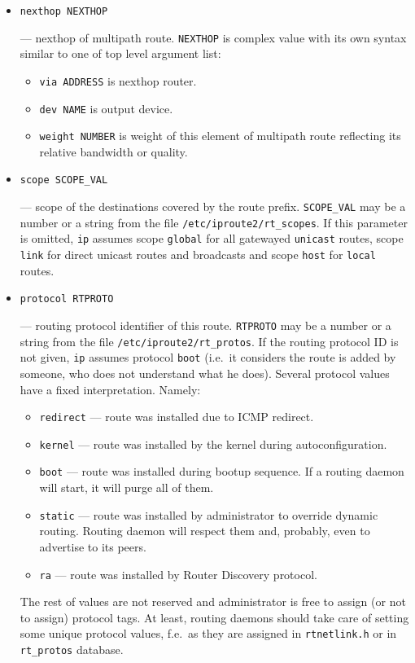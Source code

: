 \begin{itemize}
\item \verb|nexthop NEXTHOP|

--- nexthop of multipath route. \verb|NEXTHOP| is complex value
with its own syntax similar to one of top level argument list:
\begin{itemize}
\item \verb|via ADDRESS| is nexthop router.
\item \verb|dev NAME| is output device.
\item \verb|weight NUMBER| is weight of this element of multipath
route reflecting its relative bandwidth or quality.
\end{itemize}

\item \verb|scope SCOPE_VAL|

--- scope of the destinations covered by the route prefix.
\verb|SCOPE_VAL| may be a number or a string from the file
\verb|/etc/iproute2/rt_scopes|.
If this parameter is omitted,
\verb|ip| assumes scope \verb|global| for all gatewayed \verb|unicast|
routes, scope \verb|link| for direct unicast routes and broadcasts
and scope \verb|host| for \verb|local| routes.

\item \verb|protocol RTPROTO|

--- routing protocol identifier of this route.
\verb|RTPROTO| may be a number or a string from the file
\verb|/etc/iproute2/rt_protos|. If the routing protocol ID is
not given, \verb|ip| assumes protocol \verb|boot| (i.e.\
it considers the route is added by someone, who does not
understand what he does). Several protocol values have a fixed interpretation.
Namely:
\begin{itemize}
\item \verb|redirect| --- route was installed due to ICMP redirect.
\item \verb|kernel| --- route was installed by the kernel during
autoconfiguration.
\item \verb|boot| --- route was installed during bootup sequence.
If a routing daemon will start, it will purge all of them.
\item \verb|static| --- route was installed by administrator
to override dynamic routing. Routing daemon will respect them
and, probably, even to advertise to its peers.
\item \verb|ra| --- route was installed by Router Discovery protocol.
\end{itemize}
The rest of values are not reserved and administrator is free
to assign (or not to assign) protocol tags. At least, routing
daemons should take care of setting some unique protocol values,
f.e.\ as they are assigned in \verb|rtnetlink.h| or in \verb|rt_protos|
database.



\end{itemize}
